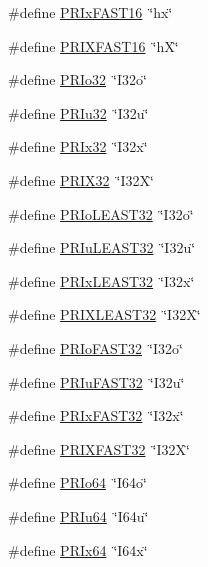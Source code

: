 \begin{DoxyCompactItemize}
\#define \hyperlink{a00113_a6f66e34285ab57a86aeb2f0f4895417d}{P\+R\+Ix\+F\+A\+S\+T16}~\char`\"{}hx\char`\"{}
\item 
\#define \hyperlink{a00113_a785eabe6337a2fa85874ae99300abb66}{P\+R\+I\+X\+F\+A\+S\+T16}~\char`\"{}hX\char`\"{}
\item 
\#define \hyperlink{a00113_a7276f64276fd7223ca6f4cca0444239a}{P\+R\+Io32}~\char`\"{}I32o\char`\"{}
\item 
\#define \hyperlink{a00113_aaf2af4a10f0bd308e9c349c8382382be}{P\+R\+Iu32}~\char`\"{}I32u\char`\"{}
\item 
\#define \hyperlink{a00113_a80ca66bcc9e366733f02c90ed4b0838c}{P\+R\+Ix32}~\char`\"{}I32x\char`\"{}
\item 
\#define \hyperlink{a00113_a32b0c8a04aae5d4454d15e6cbe109f64}{P\+R\+I\+X32}~\char`\"{}I32X\char`\"{}
\item 
\#define \hyperlink{a00113_a1e5c50a1ca71da7ff8c4f3f007411be8}{P\+R\+Io\+L\+E\+A\+S\+T32}~\char`\"{}I32o\char`\"{}
\item 
\#define \hyperlink{a00113_aab353a2898377162c1829f1a9708352e}{P\+R\+Iu\+L\+E\+A\+S\+T32}~\char`\"{}I32u\char`\"{}
\item 
\#define \hyperlink{a00113_a1d766603a3524c9e03effbbece9c2118}{P\+R\+Ix\+L\+E\+A\+S\+T32}~\char`\"{}I32x\char`\"{}
\item 
\#define \hyperlink{a00113_aaf100a10f9cd73d46294fd0e8db5246d}{P\+R\+I\+X\+L\+E\+A\+S\+T32}~\char`\"{}I32X\char`\"{}
\item 
\#define \hyperlink{a00113_a6ac7e3111d008785ddf3b29dcd088732}{P\+R\+Io\+F\+A\+S\+T32}~\char`\"{}I32o\char`\"{}
\item 
\#define \hyperlink{a00113_accc383115328197264988682edfcb72c}{P\+R\+Iu\+F\+A\+S\+T32}~\char`\"{}I32u\char`\"{}
\item 
\#define \hyperlink{a00113_a22caa684d44725e1e6e638983380f68e}{P\+R\+Ix\+F\+A\+S\+T32}~\char`\"{}I32x\char`\"{}
\item 
\#define \hyperlink{a00113_ace7057a6fa96ac7e2a05946ee96cf2d9}{P\+R\+I\+X\+F\+A\+S\+T32}~\char`\"{}I32X\char`\"{}
\item 
\#define \hyperlink{a00113_a792491e417d837fc693122428460bcba}{P\+R\+Io64}~\char`\"{}I64o\char`\"{}
\item 
\#define \hyperlink{a00113_ac582131d7a7c8ee57e73180d1714f9d5}{P\+R\+Iu64}~\char`\"{}I64u\char`\"{}
\item 
\#define \hyperlink{a00113_aba38357387a474f439428dee1984fc5a}{P\+R\+Ix64}~\char`\"{}I64x\char`\"{}
\item 

\end{DoxyCompactItemize}
